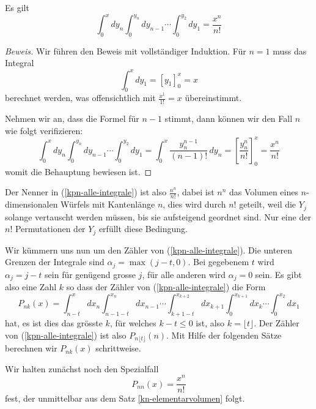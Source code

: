 \begin{satz}
\label{kn-elementarvolumen}
Es gilt
\begin{equation}
\int_0^xdy_n\int_0^{y_n}dy_{n-1}\dotsi\int_0^{y_2}dy_1=\frac{x^n}{n!}
\end{equation}
\end{satz}
\begin{proof}[Beweis] Wir führen den Beweis mit vollständiger
Induktion.
Für $n=1$ muss das Integral
\[
\int_0^xdy_1=[y_1]_0^x=x
\]
berechnet werden, was offensichtlich mit $\frac{x^1}{1!}=x$
übereinstimmt.

Nehmen wir an, dass die Formel für $n-1$ stimmt, dann können wir den
Fall $n$ wie folgt verifizieren:
\[
\int_0^xdy_n\int_0^{y_n}dy_{n-1}\dotsi\int_0^{y_2}dy_1
=
\int_0^x\frac{y_n^{n-1}}{(n-1)!}\,dy_n
=
\left[\frac{y_n^n}{n!}\right]_0^x=\frac{x^n}{n!}
\]
womit die Behauptung bewiesen ist.
\end{proof}
Der Nenner in (\ref{kpn-alle-integrale}) ist also $\frac{n^n}{n!}$,
dabei ist $n^n$ das
Volumen eines $n$-dimensionalen Würfels mit Kantenlänge $n$, dies wird
durch $n!$ geteilt, weil die $Y_j$ solange vertauscht werden müssen, bis
sie aufsteigend geordnet sind.
Nur eine der $n!$ Permutationen der $Y_j$
erfüllt diese Bedingung.

Wir kümmern uns nun um den Zähler von (\ref{kpn-alle-integrale}).
Die unteren Grenzen der Integrale sind $\alpha_j=\max(j-t,0)$.
Bei gegebenem $t$ wird $\alpha_j=j-t$
sein für genügend grosse $j$, für alle anderen wird $\alpha_j=0$ sein.
Es gibt also eine Zahl $k$ so dass der Zähler von (\ref{kpn-alle-integrale})
die Form
\[
P_{nk}(x)
=
\int_{n-t}^xdx_n\int_{n-1-t}^{x_n}dx_{n-1}\dotsi\int_{k+1-t}^{x_{k+2}}dx_{k+1}\int_0^{x_{k+1}}dx_k\dotsi\int_0^{x_2}dx_1
\]
hat, es ist dies das grösste $k$, für welches $k-t\le 0$ ist, also
$k=\lfloor t\rfloor$.
Der Zähler von (\ref{kpn-alle-integrale})
ist also $P_{n\lfloor t\rfloor}(n)$.
Mit Hilfe der folgenden Sätze berechnen wir $P_{nk}(x)$ schrittweise.

Wir halten zunächst noch den Spezialfall
\begin{equation}
P_{nn}(x)=\frac{x^n}{n!}
\label{spezialfall-pnn}
\end{equation}
fest, der unmittelbar aus dem Satz \ref{kn-elementarvolumen} folgt.

